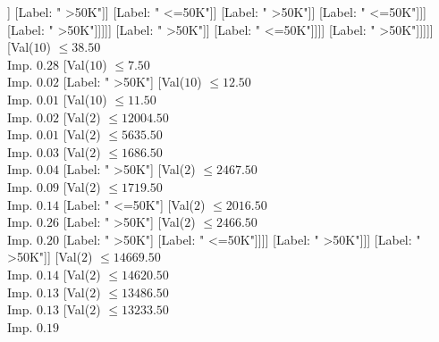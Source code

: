 \documentclass[margin=10pt]{standalone}
\begin{document}
\begin{forest}
															[Val($2$) $ \leq 17222.50$ \\ Imp. $0.09$
																[Val($2$) $ \leq 11055.50$ \\ Imp. $0.09$
																	[Label: " <=50K"]
																	[Val($2$) $ \leq 15871.50$ \\ Imp. $0.12$
																		[Val($2$) $ \leq 14471.50$ \\ Imp. $0.24$
																			[Val($2$) $ \leq 12503.50$ \\ Imp. $0.38$
																				[Val($2$) $ \leq 11562.50$ \\ Imp. $0.42$
																					[Val($2$) $ \leq 11375.50$ \\ Imp. $0.92$
																						[Label: " >50K"]
																						[Label: " <=50K"]]
																					[Label: " >50K"]]
																				[Label: " <=50K"]]
																			[Label: " >50K"]]
																		[Label: " <=50K"]]]
																[Label: " >50K"]]]]]
												[Label: " >50K"]]
											[Label: " <=50K"]]]]
								[Label: " >50K"]]]]]
				[Val($10$) $ \leq 38.50$ \\ Imp. $0.28$
					[Val($10$) $ \leq 7.50$ \\ Imp. $0.02$
						[Label: " >50K"]
						[Val($10$) $ \leq 12.50$ \\ Imp. $0.01$
							[Val($10$) $ \leq 11.50$ \\ Imp. $0.02$
								[Val($2$) $ \leq 12004.50$ \\ Imp. $0.01$
									[Val($2$) $ \leq 5635.50$ \\ Imp. $0.03$
										[Val($2$) $ \leq 1686.50$ \\ Imp. $0.04$
											[Label: " >50K"]
											[Val($2$) $ \leq 2467.50$ \\ Imp. $0.09$
												[Val($2$) $ \leq 1719.50$ \\ Imp. $0.14$
													[Label: " <=50K"]
													[Val($2$) $ \leq 2016.50$ \\ Imp. $0.26$
														[Label: " >50K"]
														[Val($2$) $ \leq 2466.50$ \\ Imp. $0.20$
															[Label: " >50K"]
															[Label: " <=50K"]]]]
												[Label: " >50K"]]]
										[Label: " >50K"]]
									[Val($2$) $ \leq 14669.50$ \\ Imp. $0.14$
										[Val($2$) $ \leq 14620.50$ \\ Imp. $0.13$
											[Val($2$) $ \leq 13486.50$ \\ Imp. $0.13$
												[Val($2$) $ \leq 13233.50$ \\ Imp. $0.19$

\end{forest}
\end{document}
